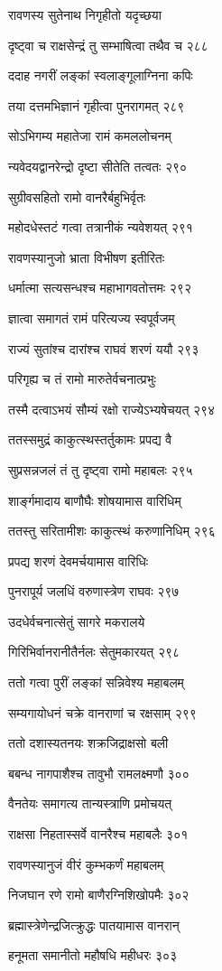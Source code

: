 रावणस्य सुतेनाथ निगृहीतो यदृच्छया

दृष्ट्वा च राक्षसेन्द्रं तु सम्भाषित्वा तथैव च २८८

ददाह नगरीं लङ्कां स्वलाङ्गूलाग्निना कपिः

तया दत्तमभिज्ञानं गृहीत्वा पुनरागमत् २८९

सोऽभिगम्य महातेजा रामं कमललोचनम्

न्यवेदयद्वानरेन्द्रो दृष्टा सीतेति तत्वतः २९०

सुग्रीवसहितो रामो वानरैर्बहुभिर्वृतः

महोदधेस्तटं गत्वा तत्रानीकं न्यवेशयत् २९१

रावणस्यानुजो भ्राता विभीषण इतीरितः

धर्मात्मा सत्यसन्धश्च महाभागवतोत्तमः २९२

ज्ञात्वा समागतं रामं परित्यज्य स्वपूर्वजम्

राज्यं सुतांश्च दारांश्च राघवं शरणं ययौ २९३

परिगृह्य च तं रामो मारुतेर्वचनात्प्रभुः

तस्मै दत्वाऽभयं सौम्यं रक्षो राज्येऽभ्यषेचयत् २९४

ततस्समुद्रं काकुत्स्थस्तर्तुकामः प्रपद्य वै

सुप्रसन्नजलं तं तु दृष्ट्वा रामो महाबलः २९५

शार्ङ्गमादाय बाणौघैः शोषयामास वारिधिम्

ततस्तु सरितामीशः काकुत्स्थं करुणानिधिम् २९६

प्रपद्य शरणं देवमर्चयामास वारिधिः

पुनरापूर्य जलधिं वरुणास्त्रेण राघवः २९७

उदधेर्वचनात्सेतुं सागरे मकरालये

गिरिभिर्वानरानीतैर्नलः सेतुमकारयत् २९८

ततो गत्वा पुरीं लङ्कां सन्निवेश्य महाबलम्

सम्यगायोधनं चक्रे वानराणां च रक्षसाम् २९९

ततो दशास्यतनयः शक्रजिद्राक्षसो बली

बबन्ध नागपाशैश्च तावुभौ रामलक्ष्मणौ ३००

वैनतेयः समागत्य तान्यस्त्राणि प्रमोचयत्

राक्षसा निहतास्सर्वे वानरैश्च महाबलैः ३०१

रावणस्यानुजं वीरं कुम्भकर्णं महाबलम्

निजघान रणे रामो बाणैरग्निशिखोपमैः ३०२

ब्रह्मास्त्रेणेन्द्रजित्क्रुद्धः पातयामास वानरान्

हनूमता समानीतो महौषधि महीधरः ३०३

